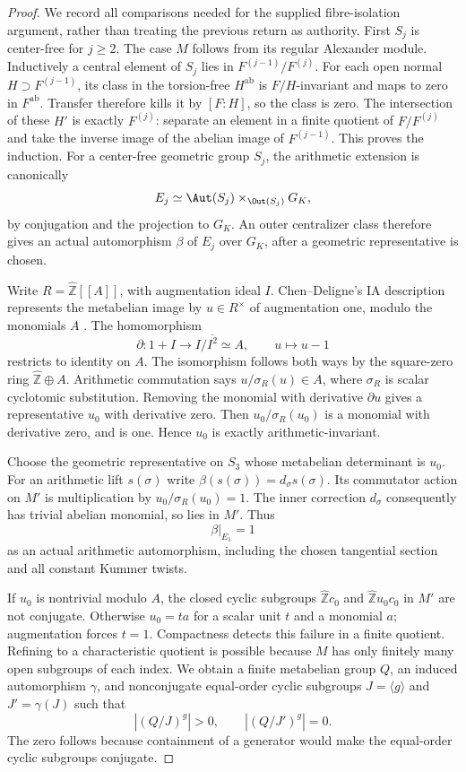 \begin{proof}
We record all comparisons needed for the supplied fibre-isolation
argument, rather than treating the previous return as authority.
First $S_j$ is center-free for $j\geq2$. The case $M$ follows
from its regular Alexander module. Inductively a central element
of $S_j$ lies in $F^{(j-1)}/F^{(j)}$. For each open normal
$H\supset F^{(j-1)}$, its class in the torsion-free
$H^{\mathrm{ab}}$ is $F/H$-invariant and maps to zero in
$F^{\mathrm{ab}}$. Transfer therefore kills it by $[F:H]$, so
the class is zero. The intersection of these $H'$ is exactly
$F^{(j)}$: separate an element in a finite quotient of
$F/F^{(j)}$ and take the inverse image of the abelian image of
$F^{(j-1)}$. This proves the induction.
For a center-free geometric group $S_j$, the arithmetic extension
is canonically
\[
 E_j\simeq\Aut(S_j)\mathbin\times_{\Out(S_j)}G_K,
\]
by conjugation and the projection to $G_K$. An outer centralizer
class therefore gives an actual automorphism $\beta$ of $E_j$
over $G_K$, after a geometric representative is chosen.

Write $R=\widehat{\mathbb Z}[[A]]$, with augmentation ideal $I$.
Chen--Deligne's IA description represents the metabelian image
by $u\in R^\times$ of augmentation one, modulo the monomials
$A$ \cite[Proposition 4.3.7]{PBC_ChenDeligne2017}.
The homomorphism
\[
        \partial:1+I\longrightarrow I/\overline{I^2}\simeq A,
           \qquad u\longmapsto u-1
\]
restricts to identity on $A$. The isomorphism follows both ways
by the square-zero ring $\widehat{\mathbb Z}\oplus A$.
Arithmetic commutation says $u/\sigma_R(u)\in A$, where
$\sigma_R$ is scalar cyclotomic substitution. Removing the
monomial with derivative $\partial u$ gives a representative
$u_0$ with derivative zero. Then $u_0/\sigma_R(u_0)$ is a
monomial with derivative zero, and is one. Hence $u_0$ is exactly
arithmetic-invariant.

Choose the geometric representative on $S_3$ whose metabelian
determinant is $u_0$. For an arithmetic lift $s(\sigma)$ write
$\beta(s(\sigma))=d_\sigma s(\sigma)$. Its commutator action
on $M'$ is multiplication by $u_0/\sigma_R(u_0)=1$.
The inner correction $d_\sigma$ consequently has trivial
abelian monomial, so lies in $M'$. Thus
\[
                       \beta|_{E_1}=1
 \tag{B.20.1}
\]
as an actual arithmetic automorphism, including the chosen
tangential section and all constant Kummer twists.

If $u_0$ is nontrivial modulo $A$, the closed cyclic subgroups
$\widehat{\mathbb Z}c_0$ and
$\widehat{\mathbb Z}u_0c_0$ in $M'$ are not conjugate.
Otherwise $u_0=ta$ for a scalar unit $t$ and a monomial $a$;
augmentation forces $t=1$. Compactness detects this failure in
a finite quotient. Refining to a characteristic quotient is
possible because $M$ has only finitely many open subgroups of
each index. We obtain a finite metabelian group $Q$, an induced
automorphism $\gamma$, and nonconjugate equal-order cyclic
subgroups $J=\langle g\rangle$ and $J'=\gamma(J)$ such that
\[
                      |(Q/J)^g|>0,\qquad |(Q/J')^g|=0.
 \tag{B.20.2}
\]
The zero follows because containment of a generator would make
the equal-order cyclic subgroups conjugate.


\end{proof}
